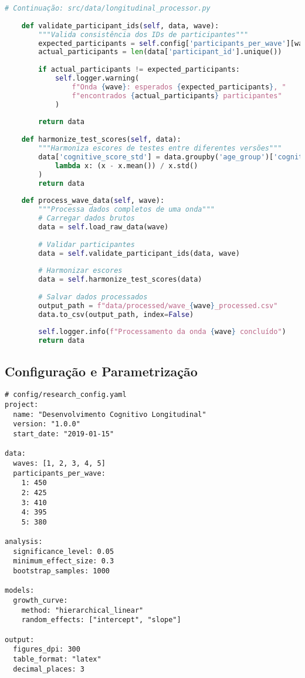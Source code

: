 \begin{pythonbox}
\begin{lstlisting}[language=Python]
# Continuação: src/data/longitudinal_processor.py
    
    def validate_participant_ids(self, data, wave):
        """Valida consistência dos IDs de participantes"""
        expected_participants = self.config['participants_per_wave'][wave]
        actual_participants = len(data['participant_id'].unique())
        
        if actual_participants != expected_participants:
            self.logger.warning(
                f"Onda {wave}: esperados {expected_participants}, "
                f"encontrados {actual_participants} participantes"
            )
        
        return data
    
    def harmonize_test_scores(self, data):
        """Harmoniza escores de testes entre diferentes versões"""
        data['cognitive_score_std'] = data.groupby('age_group')['cognitive_score'].transform(
            lambda x: (x - x.mean()) / x.std()
        )
        return data
    
    def process_wave_data(self, wave):
        """Processa dados completos de uma onda"""
        # Carregar dados brutos
        data = self.load_raw_data(wave)
        
        # Validar participantes
        data = self.validate_participant_ids(data, wave)
        
        # Harmonizar escores
        data = self.harmonize_test_scores(data)
        
        # Salvar dados processados
        output_path = f"data/processed/wave_{wave}_processed.csv"
        data.to_csv(output_path, index=False)
        
        self.logger.info(f"Processamento da onda {wave} concluído")
        return data
\end{lstlisting}
\end{pythonbox}

\subsection{Configuração e Parametrização}

\begin{pythonbox}
\begin{lstlisting}
# config/research_config.yaml
project:
  name: "Desenvolvimento Cognitivo Longitudinal"
  version: "1.0.0"
  start_date: "2019-01-15"
  
data:
  waves: [1, 2, 3, 4, 5]
  participants_per_wave:
    1: 450
    2: 425
    3: 410
    4: 395
    5: 380
  
analysis:
  significance_level: 0.05
  minimum_effect_size: 0.3
  bootstrap_samples: 1000
  
models:
  growth_curve:
    method: "hierarchical_linear"
    random_effects: ["intercept", "slope"]
  
output:
  figures_dpi: 300
  table_format: "latex"
  decimal_places: 3
\end{lstlisting}
\end{pythonbox}

